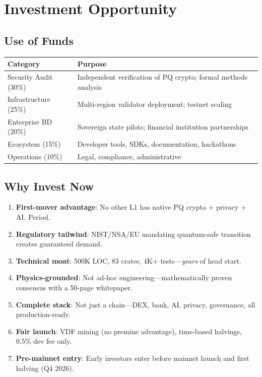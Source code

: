 \documentclass[11pt,a4paper]{article}
\begin{document}
\section{Investment Opportunity}

\subsection{Use of Funds}

\begin{center}
\begin{tabular}{@{}p{5cm}p{9cm}@{}}
\toprule
\textbf{Category} & \textbf{Purpose} \\
\midrule
Security Audit (30\%) & Independent verification of PQ crypto; formal methods analysis \\
Infrastructure (25\%) & Multi-region validator deployment; testnet scaling \\
Enterprise BD (20\%) & Sovereign state pilots; financial institution partnerships \\
Ecosystem (15\%) & Developer tools, SDKs, documentation, hackathons \\
Operations (10\%) & Legal, compliance, administrative \\
\bottomrule
\end{tabular}
\end{center}

\subsection{Why Invest Now}

\begin{enumerate}[leftmargin=1.5em]
    \item \textbf{First-mover advantage}: No other L1 has native PQ crypto + privacy + AI. Period.
    \item \textbf{Regulatory tailwind}: NIST/NSA/EU mandating quantum-safe transition creates guaranteed demand.
    \item \textbf{Technical moat}: 500K LOC, 83 crates, 4K+ tests---\textit{years} of head start.
    \item \textbf{Physics-grounded}: Not ad-hoc engineering---mathematically proven consensus with a 50-page whitepaper.
    \item \textbf{Complete stack}: Not just a chain---DEX, bank, AI, privacy, governance, all production-ready.
    \item \textbf{Fair launch}: VDF mining (no premine advantage), time-based halvings, 0.5\% dev fee only.
    \item \textbf{Pre-mainnet entry}: Early investors enter before mainnet launch and first halving (Q4 2026).
\end{enumerate}
\end{document}
